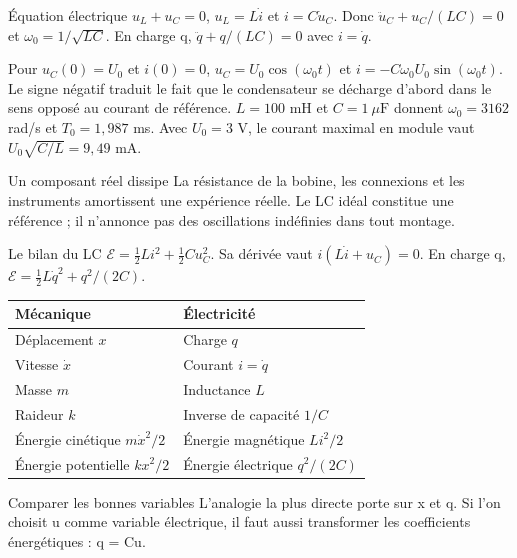 \begin{loi}{Équation électrique}
$u_L+u_C=0$, $u_L=L\dot i$ et $i=C\dot u_C$. Donc $\ddot u_C+u_C/(LC)=0$ et $\omega_0=1/\sqrt{LC}$. En charge q, $\ddot q+q/(LC)=0$ avec $i=\dot q$.
\end{loi}
Pour $u_C(0)=U_0$ et $i(0)=0$, $u_C=U_0\cos(\omega_0t)$ et $i=-C\omega_0U_0\sin(\omega_0t)$. Le signe négatif traduit le fait que le condensateur se décharge d’abord dans le sens opposé au courant de référence.
$L=100$ mH et $C=1\ \mu\mathrm{ F}$ donnent $\omega_0=3162$ rad/s et $T_0=1{,}987$ ms. Avec $U_0=3$ V, le courant maximal en module vaut $U_0\sqrt{C/L}=9{,}49$ mA.
\begin{piege}{Un composant réel dissipe}
La résistance de la bobine, les connexions et les instruments amortissent une expérience réelle. Le LC idéal constitue une référence ; il n’annonce pas des oscillations indéfinies dans tout montage.
\end{piege}


\begin{loi}{Le bilan du LC}
$\mathcal E=\tfrac12Li^2+\tfrac12Cu_C^2$. Sa dérivée vaut $i(L\dot i+u_C)=0$. En charge q, $\mathcal E=\tfrac12L\dot q^2+q^2/(2C)$.
\end{loi}
\begin{tabularx}{\linewidth}{@{}Y Y@{}}\toprule
Mécanique & Électricité\\\midrule
Déplacement $x$ & Charge $q$\\
Vitesse $\dot x$ & Courant $i=\dot q$\\
Masse $m$ & Inductance $L$\\
Raideur $k$ & Inverse de capacité $1/C$\\
Énergie cinétique $m\dot x^2/2$ & Énergie magnétique $Li^2/2$\\
Énergie potentielle $kx^2/2$ & Énergie électrique $q^2/(2C)$\\\bottomrule
\end{tabularx}
\begin{methode}{Comparer les bonnes variables}
L’analogie la plus directe porte sur x et q. Si l’on choisit u comme variable électrique, il faut aussi transformer les coefficients énergétiques : q = Cu.
\end{methode}


